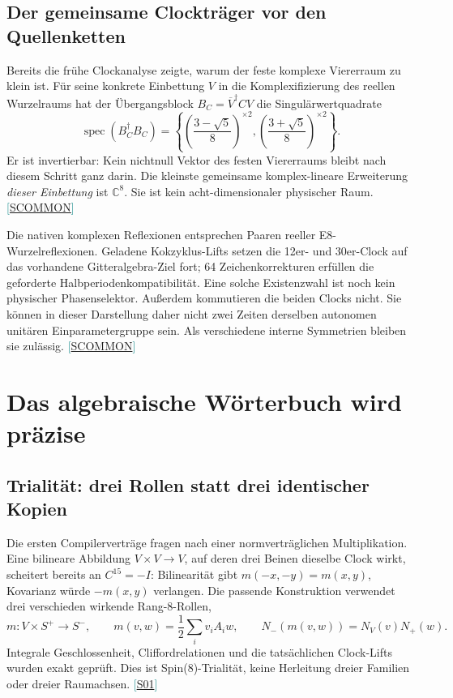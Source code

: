 \documentclass[11pt,a4paper,oneside,parskip=half,headings=normal,numbers=noenddot,bibliography=totoc]{scrreprt}
\newcommand{\C}{\mathbb C}
\newcommand{\spec}{\operatorname{spec}}
\newcommand{\src}[1]{\textcolor{teal}{\small[\hyperref[s:#1]{S#1}]}}
\begin{document}
\section{Der gemeinsame Clockträger vor den Quellenketten}
Bereits die frühe Clockanalyse zeigte, warum der feste komplexe Viererraum zu klein ist. Für seine konkrete Einbettung $V$ in die Komplexifizierung des reellen Wurzelraums hat der Übergangsblock $B_C=\overline V^{\dagger}CV$ die Singulärwertquadrate
\[
 \spec(B_C^\dagger B_C)=
 \left\{\left(\frac{3-\sqrt5}{8}\right)^{\times2},
 \left(\frac{3+\sqrt5}{8}\right)^{\times2}\right\}.
\]
Er ist invertierbar: Kein nichtnull Vektor des festen Viererraums bleibt nach diesem Schritt ganz darin. Die kleinste gemeinsame komplex-lineare Erweiterung \emph{dieser Einbettung} ist $\C^8$. Sie ist kein acht-dimensionaler physischer Raum. \src{COMMON}

Die nativen komplexen Reflexionen entsprechen Paaren reeller E8-Wurzelreflexionen. Geladene Kokzyklus-Lifts setzen die 12er- und 30er-Clock auf das vorhandene Gitteralgebra-Ziel fort; 64 Zeichenkorrekturen erfüllen die geforderte Halbperiodenkompatibilität. Eine solche Existenzwahl ist noch kein physischer Phasenselektor. Außerdem kommutieren die beiden Clocks nicht. Sie können in dieser Darstellung daher nicht zwei Zeiten derselben autonomen unitären Einparametergruppe sein. Als verschiedene interne Symmetrien bleiben sie zulässig. \src{COMMON}

\chapter{Das algebraische Wörterbuch wird präzise}
\section{Trialität: drei Rollen statt drei identischer Kopien}
Die ersten Compilerverträge fragen nach einer normverträglichen Multiplikation. Eine bilineare Abbildung $V\times V\to V$, auf deren drei Beinen dieselbe Clock wirkt, scheitert bereits an $C^{15}=-I$: Bilinearität gibt $m(-x,-y)=m(x,y)$, Kovarianz würde $-m(x,y)$ verlangen. Die passende Konstruktion verwendet drei verschieden wirkende Rang-8-Rollen,
\[
 m:V\times S^+\longrightarrow S^-,\qquad
 m(v,w)=\frac12\sum_i v_iA_iw,
 \qquad N_-(m(v,w))=N_V(v)N_+(w).
\]
Integrale Geschlossenheit, Cliffordrelationen und die tatsächlichen Clock-Lifts wurden exakt geprüft. Dies ist Spin(8)-Trialität, keine Herleitung dreier Familien oder dreier Raumachsen. \src{01}
\end{document}
